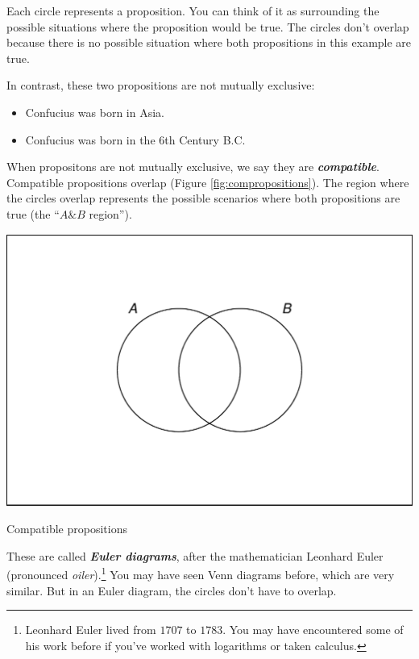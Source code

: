 \documentclass[justified]{tufte-book}
\providecommand{\tightlist}{%
  \setlength{\itemsep}{0pt}\setlength{\parskip}{0pt}}
\renewcommand{\wedge}{\mathbin{\&}}
\theoremstyle{definition}
\theoremstyle{definition}
\theoremstyle{definition}
\theoremstyle{remark}
\begin{document}
Each circle represents a proposition. You can think of it as surrounding
the possible situations where the proposition would be true. The circles
don't overlap because there is no possible situation where both
propositions in this example are true.

In contrast, these two propositions are not mutually exclusive:

\begin{itemize}
\tightlist
\item
  Confucius was born in Asia.
\item
  Confucius was born in the 6th Century B.C.
\end{itemize}

When propositons are not mutually exclusive, we say they are
\textbf{\emph{compatible}}. Compatible propositions overlap (Figure
\ref{fig:compropositions}). The region where the circles overlap
represents the possible scenarios where both propositions are true (the
``\(A \wedge B\) region'').

\begin{marginfigure}
\includegraphics{_main_files/figure-latex/compropositions-1} \caption[Compatible propositions]{Compatible propositions}\label{fig:compropositions}
\end{marginfigure}

These are called \textbf{\emph{Euler diagrams}}, after the mathematician
Leonhard Euler (pronounced \emph{oiler}).\footnote{Leonhard Euler lived
  from \(1707\) to \(1783\). You may have encountered some of his work
  before if you've worked with logarithms or taken calculus.} You may
have seen Venn diagrams before, which are very similar. But in an Euler
diagram, the circles don't have to overlap.
\end{document}
